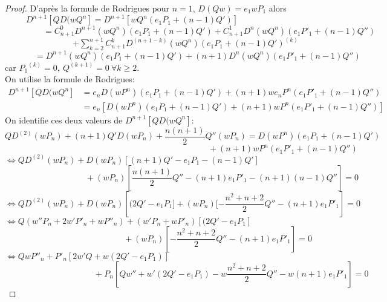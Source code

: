 \begin{proof}
D'après la formule de Rodrigues pour $n=1$, $D(Qw)=e_{1}wP_{1}$ alors
\\$\phantom{11111}D^{n+1}[QD(wQ^{n}] = D^{n+1}[wQ^{n}(e_{1}P_{1}+(n-1)Q')]$
\\$ $\\$\phantom{111111111} = C^0_{n+1} D^{n+1}(wQ^{n})(e_{1}P_{1} + (n-1)Q') + C^1_{n+1} D^{n}(wQ^{n})(e_{1}{P'}_{1}+(n-1)Q'')$
\\$\phantom{1111111111111111} \displaystyle{+ \sum_{k=2}^{n+1}C^k_{n+1} D^{(n+1-k)}(wQ^{n})(e_{1}P_{1}+(n-1)Q')^{(k)}}$
\\$\phantom{1111111} = D^{n+1}(wQ^{n})(e_{1}P_{1}+(n-1)Q')+(n+1)D^{n}(wQ^{n})(e_{1}{P'}_{1}+(n-1)Q'')$
\\$ $\\car ${P_{1}}^{(k)}=0, \ Q^{(k+1)}=0 \ \forall k \geqslant 2$.
\\$ $\\On utilise la formule de Rodrigues:
\begin{align*}
D^{n+1}[QD(wQ^{n}] & = e_{n}D(wP^{n})(e_{1}P_{1}+(n-1)Q')+(n+1)we_{n}P^{n}(e_{1}{P'}_{1}+(n-1)Q'')\\
& = e_{n}[D(wP^{n})(e_{1}P_{1}+(n-1)Q')+(n+1)wP^{n}(e_{1}{P'}_{1}+(n-1)Q'')]
\end{align*}
On identifie ces deux valeurs de $D^{n+1}[QD(wQ^{n}]$:
\\$QD^{(2)}(wP_{n})+(n+1)Q'D(wP_{n})+\dfrac{n(n+1)}{2}Q''(wP_{n}) = D(wP^{n})(e_{1}P_{1}+(n-1)Q')$
\\$\phantom{111111111111111111111111111111111111111111111111}+(n+1)wP^{n}(e_{1}{P'}_{1}+(n-1)Q'')$
\\$ $\\$\Leftrightarrow QD^{(2)}(wP_{n})+D(wP_{n})[(n+1)Q'-e_{1}P_{1}-(n-1)Q']$
\\$\phantom{1111111111111111111}+(wP_{n})\left[\dfrac{n(n+1)}{2}Q''-(n+1)e_{1}{P'}_{1}-(n+1)(n-1)Q''\right] = 0$
\\$\Leftrightarrow QD^{(2)}(wP_{n})+D(wP_{n})\left[(2Q'-e_{1}P_{1}]+(wP_{n})[-\dfrac{n^{2}+n+2}{2}Q''-(n+1)e_{1}{P'}_{1}\right] = 0$
\\$ $\\$\Leftrightarrow Q(w''P_{n}+2w'{P'}_{n}+w{P''}_{n})+(w'P_{n}+w{P'}_{n})[(2Q'-e_{1}P_{1}]$
\\$\phantom{1111111111111111111111111111}+(wP_{n})\left[-\dfrac{n^{2}+n+2}{2}Q''-(n+1)e_{1}{P'}_{1}\right] = 0$
\\$\Leftrightarrow Qw{P''}_{n}+{P'}_{n}[2w'Q+w(2Q'-e_{1}P_{1})]$
\\$\phantom{111111111111111111111}+P_{n}[Qw''+w'(2Q'-e_{1}P_{1})-w\dfrac{n^{2}+n+2}{2}Q''-w(n+1)e_{1}{P'}_{1}] = 0$

\end{proof}
